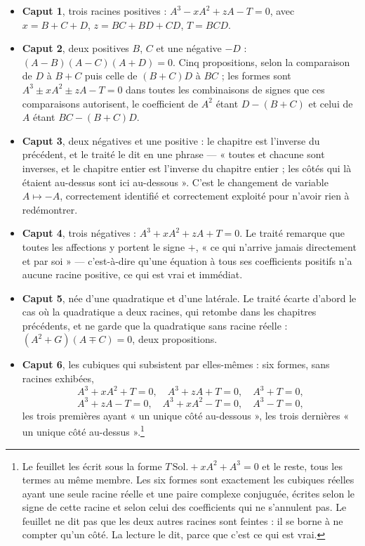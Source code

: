 \documentclass[11pt,a4paper]{article}
\begin{document}
\begin{itemize}
  \item \textbf{Caput 1}, trois racines positives :
    $A^3 - xA^2 + zA - T = 0$, avec $x = B+C+D$, $z = BC+BD+CD$, $T = BCD$.
  \item \textbf{Caput 2}, deux positives $B$, $C$ et une négative $-D$ :
    $(A-B)(A-C)(A+D) = 0$. Cinq propositions, selon la comparaison de $D$ à
    $B+C$ puis celle de $(B+C)D$ à $BC$ ; les formes sont
    $A^3 \pm xA^2 \pm zA - T = 0$ dans toutes les combinaisons de signes que
    ces comparaisons autorisent, le coefficient de $A^2$ étant $D - (B+C)$ et
    celui de $A$ étant $BC - (B+C)D$.
  \item \textbf{Caput 3}, deux négatives et une positive : le chapitre est
    l'inverse du précédent, et le traité le dit en une phrase — « toutes et
    chacune sont inverses, et le chapitre entier est l'inverse du chapitre
    entier ; les côtés qui là étaient au-dessus sont ici au-dessous ». C'est le
    changement de variable $A \mapsto -A$, correctement identifié et
    correctement exploité pour n'avoir rien à redémontrer.
  \item \textbf{Caput 4}, trois négatives : $A^3 + xA^2 + zA + T = 0$. Le
    traité remarque que toutes les affections y portent le signe $+$, « ce qui
    n'arrive jamais directement et par soi » — c'est-à-dire qu'une équation à
    tous ses coefficients positifs n'a aucune racine positive, ce qui est vrai
    et immédiat.
  \item \textbf{Caput 5}, née d'une quadratique et d'une latérale. Le traité
    écarte d'abord le cas où la quadratique a deux racines, qui retombe dans
    les chapitres précédents, et ne garde que la quadratique sans racine
    réelle : $(A^2+G)(A \mp C) = 0$, deux propositions.
  \item \textbf{Caput 6}, les cubiques qui subsistent par elles-mêmes : six
    formes, sans racines exhibées,
    \[ A^3 + xA^2 + T = 0, \quad A^3 + zA + T = 0, \quad A^3 + T = 0, \]
    \[ A^3 + zA - T = 0, \quad A^3 + xA^2 - T = 0, \quad A^3 - T = 0, \]
    les trois premières ayant « un unique côté au-dessous », les trois dernières
    « un unique côté au-dessus ».\footnote{Le feuillet les écrit sous la forme
    $T\,\mathrm{Sol.} + xA^2 + A^3 = 0$ et le reste, tous les termes au même
    membre. Les six formes sont exactement les cubiques réelles ayant une seule
    racine réelle et une paire complexe conjuguée, écrites selon le signe de
    cette racine et selon celui des coefficients qui ne s'annulent pas. Le
    feuillet ne dit pas que les deux autres racines sont feintes : il se borne à
    ne compter qu'un côté. La lecture le dit, parce que c'est ce qui est vrai.}
\end{itemize}
\end{document}
